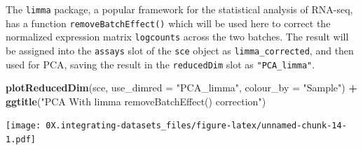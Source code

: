 \documentclass[]{book}
\newenvironment{Shaded}{\begin{snugshade}}{\end{snugshade}}
\newcommand{\CommentTok}[1]{\textcolor[rgb]{0.56,0.35,0.01}{\textit{#1}}}
\newcommand{\DataTypeTok}[1]{\textcolor[rgb]{0.13,0.29,0.53}{#1}}
\newcommand{\DecValTok}[1]{\textcolor[rgb]{0.00,0.00,0.81}{#1}}
\newcommand{\KeywordTok}[1]{\textcolor[rgb]{0.13,0.29,0.53}{\textbf{#1}}}
\newcommand{\NormalTok}[1]{#1}
\newcommand{\OperatorTok}[1]{\textcolor[rgb]{0.81,0.36,0.00}{\textbf{#1}}}
\newcommand{\StringTok}[1]{\textcolor[rgb]{0.31,0.60,0.02}{#1}}
\begin{document}
The \texttt{limma} package, a popular framework for the statistical analysis of RNA-seq, has a function \texttt{removeBatchEffect()} which will be used here to correct the normalized expression matrix \texttt{logcounts} across the two batches. The result will be assigned into the \texttt{assays} slot of the \texttt{sce} object as \texttt{limma\_corrected}, and then used for PCA, saving the result in the \texttt{reducedDim} slot as \texttt{"PCA\_limma"}.

\begin{Shaded}
\end{Shaded}

\begin{Shaded}
\begin{Highlighting}[]
\KeywordTok{plotReducedDim}\NormalTok{(sce, }\DataTypeTok{use_dimred =} \StringTok{"PCA_limma"}\NormalTok{,}
               \DataTypeTok{colour_by =} \StringTok{"Sample"}\NormalTok{) }\OperatorTok{+}\StringTok{ }
\StringTok{    }\KeywordTok{ggtitle}\NormalTok{(}\StringTok{"PCA With limma removeBatchEffect() correction"}\NormalTok{)}
\end{Highlighting}
\end{Shaded}

\texttt{[image: 0X.integrating-datasets\_files/figure-latex/unnamed-chunk-14-1.pdf]}
\end{document}
